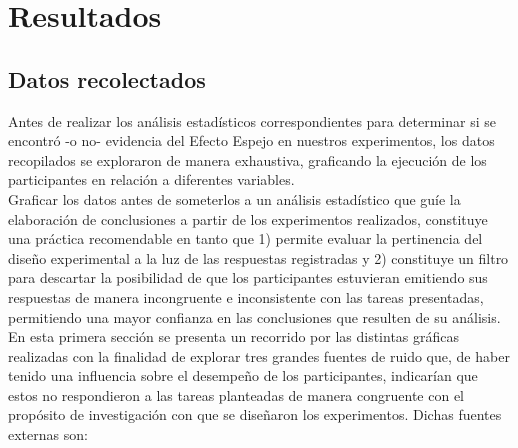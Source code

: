 
\chapter{Resultados} %
\label{Cap_Res} %



\section{Datos recolectados}

Antes de realizar los análisis estadísticos correspondientes para determinar si se encontró -o no- evidencia del Efecto Espejo en nuestros experimentos, los datos recopilados se exploraron de manera exhaustiva, graficando la ejecución de los participantes en relación a diferentes variables.\\ 

Graficar los datos antes de someterlos a un análisis estadístico que guíe la elaboración de conclusiones a partir de los experimentos realizados, constituye una práctica recomendable en tanto que 1) permite evaluar la pertinencia del diseño experimental a la luz de las respuestas registradas y 2) constituye un filtro para descartar la posibilidad de que los participantes estuvieran emitiendo sus respuestas de manera incongruente e inconsistente con las tareas presentadas, permitiendo una mayor confianza en las conclusiones que resulten de su análisis.\\

En esta primera sección se presenta un recorrido por las distintas gráficas realizadas con la finalidad de explorar tres grandes fuentes de ruido que, de haber tenido una influencia sobre el desempeño de los participantes, indicarían que estos no respondieron a las tareas planteadas de manera congruente con el propósito de investigación con que se diseñaron los experimentos. Dichas fuentes externas son: 

